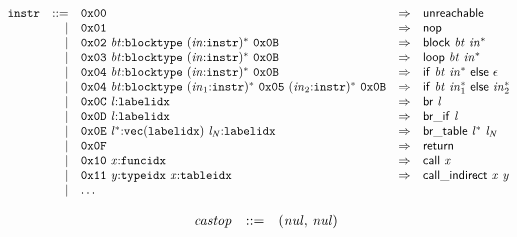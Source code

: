 \vspace{1ex}

$$
\begin{array}{@{}l@{}rrlll@{}l@{}}
& {\mathtt{instr}} &::=& \mathtt{0x00} &\Rightarrow& \mathsf{unreachable} \\ &&|&
\mathtt{0x01} &\Rightarrow& \mathsf{nop} \\ &&|&
\mathtt{0x02}~{\mathit{bt}}{:}{\mathtt{blocktype}}~{({\mathit{in}}{:}{\mathtt{instr}})^\ast}~\mathtt{0x0B} &\Rightarrow& \mathsf{block}~{\mathit{bt}}~{{\mathit{in}}^\ast} \\ &&|&
\mathtt{0x03}~{\mathit{bt}}{:}{\mathtt{blocktype}}~{({\mathit{in}}{:}{\mathtt{instr}})^\ast}~\mathtt{0x0B} &\Rightarrow& \mathsf{loop}~{\mathit{bt}}~{{\mathit{in}}^\ast} \\ &&|&
\mathtt{0x04}~{\mathit{bt}}{:}{\mathtt{blocktype}}~{({\mathit{in}}{:}{\mathtt{instr}})^\ast}~\mathtt{0x0B} &\Rightarrow& \mathsf{if}~{\mathit{bt}}~{{\mathit{in}}^\ast}~\mathsf{else}~\epsilon \\ &&|&
\mathtt{0x04}~{\mathit{bt}}{:}{\mathtt{blocktype}}~{({\mathit{in}}_{{1}}{:}{\mathtt{instr}})^\ast}~\mathtt{0x05}~{({\mathit{in}}_{{2}}{:}{\mathtt{instr}})^\ast}~\mathtt{0x0B} &\Rightarrow& \mathsf{if}~{\mathit{bt}}~{{\mathit{in}}_{{1}}^\ast}~\mathsf{else}~{{\mathit{in}}_{{2}}^\ast} \\ &&|&
\mathtt{0x0C}~{\mathit{l}}{:}{\mathtt{labelidx}} &\Rightarrow& \mathsf{br}~{\mathit{l}} \\ &&|&
\mathtt{0x0D}~{\mathit{l}}{:}{\mathtt{labelidx}} &\Rightarrow& \mathsf{br\_if}~{\mathit{l}} \\ &&|&
\mathtt{0x0E}~{{\mathit{l}}^\ast}{:}{\mathtt{vec}}({\mathtt{labelidx}})~{\mathit{l}}_{{\mathit{N}}}{:}{\mathtt{labelidx}} &\Rightarrow& \mathsf{br\_table}~{{\mathit{l}}^\ast}~{\mathit{l}}_{{\mathit{N}}} \\ &&|&
\mathtt{0x0F} &\Rightarrow& \mathsf{return} \\ &&|&
\mathtt{0x10}~{\mathit{x}}{:}{\mathtt{funcidx}} &\Rightarrow& \mathsf{call}~{\mathit{x}} \\ &&|&
\mathtt{0x11}~{\mathit{y}}{:}{\mathtt{typeidx}}~{\mathit{x}}{:}{\mathtt{tableidx}} &\Rightarrow& \mathsf{call\_indirect}~{\mathit{x}}~{\mathit{y}} \\ &&|&
\dots \\
\end{array}
$$

\vspace{1ex}

$$
\begin{array}{@{}lrrl@{}l@{}}
& {\mathit{castop}} &::=& ({\mathit{nul}},\, {\mathit{nul}}) \\
\end{array}
$$

